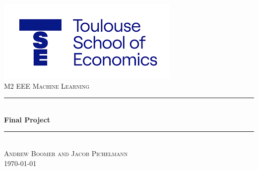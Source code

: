 


\begin{titlepage}

\newcommand{\HRule}{\rule{\linewidth}{0.25mm}} %
\setlength{\topmargin}{-0.5in}
\center %

\includegraphics[scale=0.75]{TSE.png}\\

\large \textsc{M2 EEE Machine Learning} 
\vspace{1.5cm}
\textsc{\large } %


\HRule \\[0.75cm]
{ \huge \bfseries Final Project}\\[0.5cm] %
\HRule \\[1.75cm]
 

\large\textsc{Andrew Boomer and Jacob Pichelmann} \\[1.5cm]


{\large \today}\\[0.5cm] %

\vfill %

\end{titlepage}

